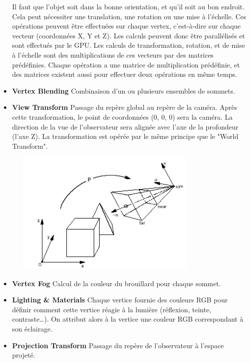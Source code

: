\begin{itemize}
Il faut que l’objet soit dans la bonne orientation, et qu’il soit au bon endroit. Cela peut nécessiter une translation, une rotation ou une mise à l’échelle. Ces opérations peuvent être effectuées sur chaque vertex, c’est-à-dire sur chaque vecteur (coordonnées X, Y et Z). Les calculs peuvent donc être parallélisés et sont effectués par le GPU. Les calculs de transformation, rotation, et de mise à l’échelle sont des multiplications de ces vecteurs par des matrices prédéfinies. Chaque opération a une matrice de multiplication prédéfinie, et des matrices existent aussi pour effectuer deux opérations en même temps.
\\
	\item{\textbf{Vertex Blending}}
Combinaison d’un ou plusieurs ensembles de sommets.
\\
	\item{\textbf{View Transform}}
Passage du repère global au repère de la caméra. Après cette transformation, le point de coordonnées (0, 0, 0) sera la caméra. La direction de la vue de l’observateur sera alignée avec l'axe de la profondeur (l'axe Z). La transformation est opérée par le même principe que le "World Transform".
\\
\begin{center}
\includegraphics[width=10cm,height=60mm]{leo/images/repereCamera.png}
\end{center}

	\item{\textbf{Vertex Fog}}
Calcul de la couleur du brouillard pour chaque sommet.
\\
	\item{\textbf{Lighting \& Materials}}
Chaque vertice fournie des couleurs RGB pour définir comment cette vertice réagie à la lumière (réflexion, teinte, contraste…). On attribut alors à la vertice une couleur RGB correspondant à son éclairage.
\\
	\item{\textbf{Projection Transform}}
Passage du repère de l'observateur à l'espace projeté.
\\
\end{itemize}

